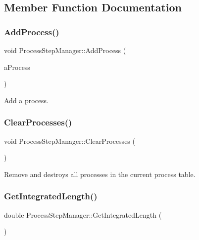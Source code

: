\subsection{Member Function Documentation}
\mbox{\label{classProcessStepManager_ae4c8d521e07847880da29ebe02fc8f2d}} 
\subsubsection{\texorpdfstring{Add\+Process()}{AddProcess()}}
{\footnotesize\ttfamily void Process\+Step\+Manager\+::\+Add\+Process (\begin{DoxyParamCaption}\item[{\hyperlink{classBunchProcess}{Bunch\+Process} $\ast$}]{a\+Process }\end{DoxyParamCaption})}

Add a process. \mbox{\label{classProcessStepManager_ab113f9ed035177beed45fe372a78843c}} 
\subsubsection{\texorpdfstring{Clear\+Processes()}{ClearProcesses()}}
{\footnotesize\ttfamily void Process\+Step\+Manager\+::\+Clear\+Processes (\begin{DoxyParamCaption}{ }\end{DoxyParamCaption})}

Remove and destroys all processes in the current process table. \mbox{\label{classProcessStepManager_ad8f5321c873d121e5419b6dc47313c00}} 
\subsubsection{\texorpdfstring{Get\+Integrated\+Length()}{GetIntegratedLength()}}
{\footnotesize\ttfamily double Process\+Step\+Manager\+::\+Get\+Integrated\+Length (\begin{DoxyParamCaption}{ }\end{DoxyParamCaption})}


